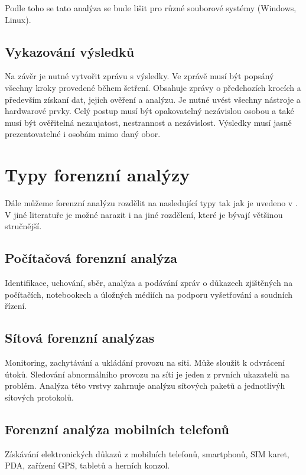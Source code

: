 \documentclass[thesis=B,czech]{FITthesis}[2012/06/26]
\begin{document}
\cite{for_root} Podle toho se tato analýza se bude lišit pro různé souborové systémy (Windows, Linux).

\subsection{Vykazování výsledků}
Na závěr je nutné vytvořit zprávu s výsledky. Ve zprávě musí být popsáný všechny kroky provedené během šetření. Obsahuje zprávy o předchozích krocích a především získaní dat, jejich ověření a analýzu. Je nutné uvést všechny nástroje a hardwarové prvky. Celý postup musí být opakovatelný nezávislou osobou a také musí být ověřitelná nezaujatost, nestrannost a nezávislost. Výsledky musí jasně prezentovatelné i osobám mimo daný obor.

\section{Typy forenzní analýzy}
Dále můžeme forenzní analýzu rozdělit na nasledující typy tak jak je uvedeno v \cite{for_types}. V jiné literatuře je možné narazit i na jiné rozdělení, které je bývají většinou stručnější.

\subsection{Počítačová forenzní analýza}
Identifikace, uchování, sběr, analýza a podávání zpráv o důkazech zjištěných na počítačích, notebookech a úložných médiích na podporu vyšetřování a soudních řízení.

\subsection{Sítová forenzní analýzas}
Monitoring, zachytávání a ukládání provozu na síti. Může sloužit k odvrácení útoků. Sledování abnormálního provozu na síti je jeden z prvních ukazatelů na problém. Analýza této vrstvy zahrnuje analýzu sítových paketů a jednotlivýh sítových protokolů\cite{carrier2003defining}.

\subsection{Forenzní analýza  mobilních telefonů}
Získávání elektronických důkazů z mobilních telefonů, smartphonů, SIM karet, PDA, zařízení GPS, tabletů a herních konzol.
\end{document}
